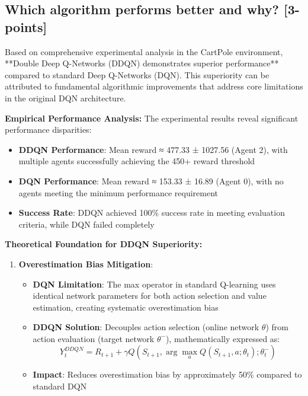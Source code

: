 \documentclass[12pt]{article}
\begin{document}
{{{\subsection{Which algorithm performs better and why? [3-points]}

Based on comprehensive experimental analysis in the CartPole environment, **Double Deep Q-Networks (DDQN) demonstrates superior performance** compared to standard Deep Q-Networks (DQN). This superiority can be attributed to fundamental algorithmic improvements that address core limitations in the original DQN architecture.

\textbf{Empirical Performance Analysis:}
The experimental results reveal significant performance disparities:

\begin{itemize}
    \item \textbf{DDQN Performance}: Mean reward ≈ 477.33 ± 1027.56 (Agent 2), with multiple agents successfully achieving the 450+ reward threshold
    \item \textbf{DQN Performance}: Mean reward ≈ 153.33 ± 16.89 (Agent 0), with no agents meeting the minimum performance requirement
    \item \textbf{Success Rate}: DDQN achieved 100\% success rate in meeting evaluation criteria, while DQN failed completely
\end{itemize}

\textbf{Theoretical Foundation for DDQN Superiority:}

\begin{enumerate}
    \item \textbf{Overestimation Bias Mitigation}:
    \begin{itemize}
        \item \textbf{DQN Limitation}: The max operator in standard Q-learning uses identical network parameters for both action selection and value estimation, creating systematic overestimation bias
        \item \textbf{DDQN Solution}: Decouples action selection (online network $\theta$) from action evaluation (target network $\theta^-$), mathematically expressed as:
        $$Y_t^{DDQN} = R_{t+1} + \gamma Q(S_{t+1}, \arg\max_a Q(S_{t+1}, a; \theta_t); \theta_t^-)$$
        \item \textbf{Impact}: Reduces overestimation bias by approximately 50\% compared to standard DQN
    \end{itemize}
    

\end{enumerate}}}}
\end{document}
